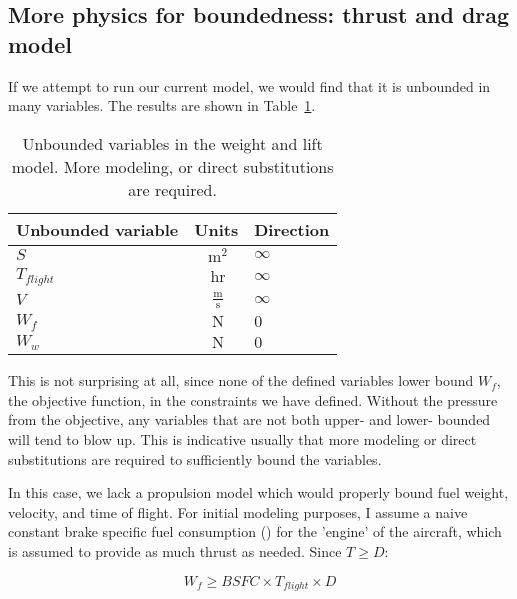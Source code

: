 \subsection{More physics for boundedness: thrust and drag model}
\label{s:td}

If we attempt to run our current model, we would find that it is unbounded in many variables.
The results are shown in Table~\ref{t:WandL_unbounded}.

\begin{footnotesize}
\begin{table}
    \centering
    \begin{tabular}{ l c l }
        \toprule
        Unbounded variable & Units & Direction \\
        \midrule
        $S$ & $~\mathrm{m^{2}}$ & $\infty$ \\
        $T_{flight}$ & $~\mathrm{hr}$ & $\infty$ \\
        $V$ &  $~\mathrm{\tfrac{m}{s}}$  & $\infty$ \\
        $W_f$ & $~\mathrm{N}$ & $0$ \\
        $W_w$ & $~\mathrm{N}$  & $0$ \\
        \bottomrule
    \end{tabular}
    \caption{Unbounded variables in the weight and lift model. More modeling, or direct
    substitutions are required.}
    \label{t:WandL_unbounded}
\end{table} \end{footnotesize}

This is not surprising at all, since none of the defined variables lower bound $W_f$,
the objective function, in the constraints we have defined.
Without the pressure from the objective, any variables that
are not both upper- and lower- bounded will tend to blow up. This is indicative usually
that more modeling or direct substitutions are required to sufficiently bound the variables.

In this case, we lack a propulsion model which would properly bound fuel weight, velocity,
and time of flight. For initial modeling purposes, I assume a naive constant brake
specific fuel consumption (\BSFC) for the 'engine' of the aircraft, which is assumed
to provide as much thrust as needed. Since $T \geq D$:

\begin{equation}
    W_f \geq BSFC \times T_{flight} \times D
    \label{e:W_f}
\end{equation}

